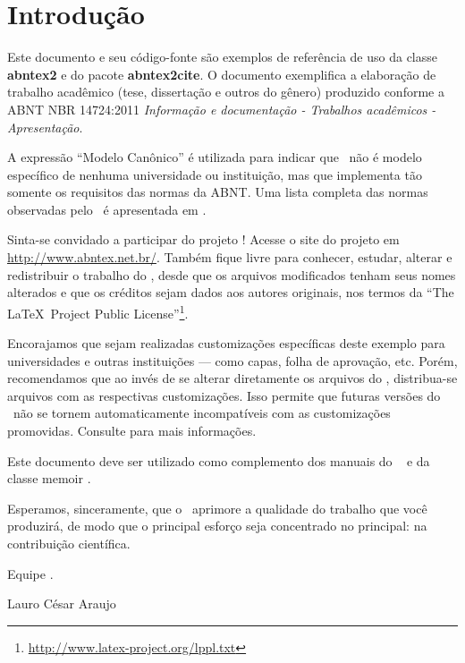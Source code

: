 \chapter{Introdução}

Este documento e seu código-fonte são exemplos de referência de uso da classe \textbf{abntex2} e do pacote \textbf{abntex2cite}. O documento exemplifica a elaboração de trabalho acadêmico (tese, dissertação e outros do gênero) produzido conforme a ABNT NBR 14724:2011 \emph{Informação e documentação - Trabalhos acadêmicos - Apresentação}.

A expressão ``Modelo Canônico'' é utilizada para indicar que \abnTeX\ não é modelo específico de nenhuma universidade ou instituição, mas que implementa tão somente os requisitos das normas da ABNT. Uma lista completa das normas observadas pelo \abnTeX\ é apresentada em .

Sinta-se convidado a participar do projeto \abnTeX! Acesse o site do projeto em \url{http://www.abntex.net.br/}. Também fique livre para conhecer, estudar, alterar e redistribuir o trabalho do \abnTeX, desde que os arquivos modificados tenham seus nomes alterados e que os créditos sejam dados aos autores originais, nos termos da ``The \LaTeX\ Project Public License''\footnote{\url{http://www.latex-project.org/lppl.txt}}.

Encorajamos que sejam realizadas customizações específicas deste exemplo para universidades e outras instituições --- como capas, folha de aprovação, etc. Porém, recomendamos que ao invés de se alterar diretamente os arquivos do \abnTeX, distribua-se arquivos com as respectivas customizações. Isso permite que futuras versões do \abnTeX~não se tornem automaticamente incompatíveis com as customizações promovidas. Consulte  para mais informações.

Este documento deve ser utilizado como complemento dos manuais do \abnTeX\ \cite{abntex2classe,abntex2cite,abntex2cite-alf} e da classe \textsf{memoir} \cite{memoir}. 

Esperamos, sinceramente, que o \abnTeX\ aprimore a qualidade do trabalho que você produzirá, de modo que o principal esforço seja concentrado no principal: na contribuição científica. 

Equipe \abnTeX. 

Lauro César Araujo
